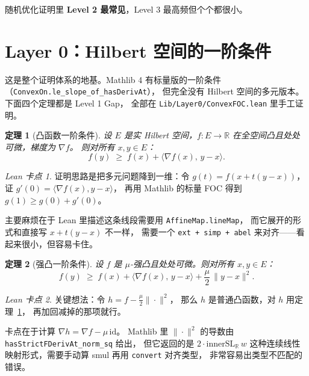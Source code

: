 \documentclass[11pt]{article}
\newtheorem{theorem}{定理}[section]
\theoremstyle{remark}
\newtheorem*{leanremark}{Lean 卡点}
\begin{document}
随机优化证明里 \textbf{Level 2 最常见}，Level 3 最高频但个个都很小。

\section{Layer 0：Hilbert 空间的一阶条件}

这是整个证明体系的地基。Mathlib 4 有标量版的一阶条件
（\texttt{ConvexOn.le\_slope\_of\_hasDerivAt}），
但完全没有 Hilbert 空间的多元版本。
下面四个定理都是 Level 1 Gap，
全部在 \texttt{Lib/Layer0/ConvexFOC.lean} 里手工证明。

\begin{theorem}[凸函数一阶条件]
  \label{thm:convex-foc}
  设 $E$ 是实 Hilbert 空间，$f : E \to \mathbb{R}$ 在全空间凸且处处可微，梯度为 $\nabla f$。
  则对所有 $x, y \in E$：
  \[
    f(y) \;\geq\; f(x) + \langle \nabla f(x),\, y - x \rangle.
  \]
\end{theorem}

\begin{leanremark}
  证明思路是把多元问题降到一维：令 $g(t) = f(x + t(y-x))$，
  证 $g'(0) = \langle \nabla f(x), y-x \rangle$，
  再用 Mathlib 的标量 FOC 得到 $g(1) \geq g(0) + g'(0)$。

  主要麻烦在于 Lean 里描述这条线段需要用 \texttt{AffineMap.lineMap}，
  而它展开的形式和直接写 $x + t(y-x)$ 不一样，
  需要一个 \texttt{ext + simp + abel} 来对齐——看起来很小，但容易卡住。
\end{leanremark}

\begin{theorem}[强凸一阶条件]
  \label{thm:sc-foc}
  设 $f$ 是 $\mu$-强凸且处处可微。则对所有 $x, y \in E$：
  \[
    f(y) \;\geq\; f(x) + \langle \nabla f(x),\, y - x \rangle
           + \frac{\mu}{2}\,\|y - x\|^2.
  \]
\end{theorem}

\begin{leanremark}
  关键想法：令 $h = f - \frac{\mu}{2}\|\cdot\|^2$，
  那么 $h$ 是普通凸函数，对 $h$ 用定理~\ref{thm:convex-foc}，
  再加回减掉的那项就行。

  卡点在于计算 $\nabla h = \nabla f - \mu\,\mathrm{id}$。
  Mathlib 里 $\|\cdot\|^2$ 的导数由
  \texttt{hasStrictFDerivAt\_norm\_sq} 给出，
  但它返回的是 $2 \cdot \mathrm{innerSL}_{\mathbb{R}}\, w$
  这种连续线性映射形式，需要手动算 smul 再用 \texttt{convert} 对齐类型，
  非常容易出类型不匹配的错误。
\end{leanremark}
\end{document}
